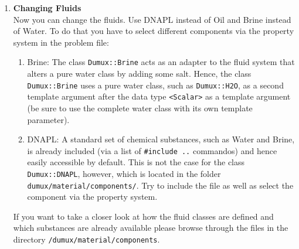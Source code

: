 \begin{enumerate}
\item \textbf{Changing Fluids} \\
Now you can change the fluids. Use DNAPL instead of Oil and Brine instead of Water.
To do that you have to select different components via the property system in the problem file:
\begin{enumerate}
 \item Brine: The class \texttt{Dumux::Brine} acts as an adapter to the fluid system
 that alters a pure water class by adding some salt. Hence, the class \texttt{Dumux::Brine}
 uses a pure water class, such as \texttt{Dumux::H2O}, as a second template
 argument after the data type \texttt{<Scalar>} as a template argument (be sure
 to use the complete water class with its own template parameter).
 \item DNAPL: A standard set of chemical substances, such as Water and Brine,
 is already included (via a list of \texttt{\#include ..} commandos) and hence
 easily accessible by default. This is not the case for the class \texttt{Dumux::DNAPL},
 however, which is located in the folder \texttt{dumux/material/components/}. Try to
 include the file as well as select the component via the property system.
\end{enumerate}
If you want to take a closer look at how the fluid classes are defined and which
substances are already available please browse through the files in the directory
\texttt{/dumux/material/components}.


\end{enumerate}

